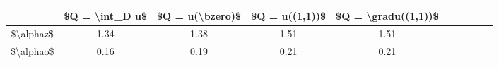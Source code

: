 \begin{tabular}{Sc Sc Sc Sc Sc}
\toprule
{} & \$Q = \textbackslash int\_D u\$ & \$Q = u(\textbackslash bzero)\$ & \$Q = u((1,1))\$ & \$Q = \textbackslash gradu((1,1))\$ \\
\midrule
\$\textbackslash alphaz\$ &           1.34 &            1.38 &           1.51 &                1.51 \\
\$\textbackslash alphao\$ &           0.16 &            0.19 &           0.21 &                0.21 \\
\bottomrule
\end{tabular}

